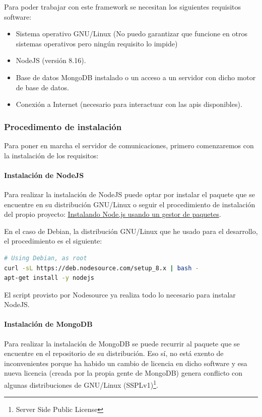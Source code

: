 \documentclass[spanish,12pt, a4paper, twoside]{paper}
\begin{document}
Para poder trabajar con este framework se necesitan los siguientes requisitos software:

\begin{itemize}
\item Sistema operativo GNU/Linux (No puedo garantizar que funcione en otros sistemas operativos pero ningún requisito lo impide)
\item NodeJS (versión 8.16).
\item Base de datos MongoDB instalado o un acceso a un servidor con dicho motor de base de datos.
\item Conexión a Internet (necesario para interactuar con las apis disponibles).
\end{itemize}

\subsubsection{Procedimento de instalación}

Para poner en marcha el servidor de comunicaciones, primero comenzaremos con la instalación de los requisitos:

\paragraph{Instalación de NodeJS}

Para realizar la instalación de NodeJS puede optar por instalar el paquete que se encuentre en su distribución GNU/Linux o seguir el procedimiento de instalación del propio proyecto: \href{https://nodejs.org/es/download/package-manager/}{Instalando Node.js usando un gestor de paquetes}.
\newline

En el caso de Debian, la distribución GNU/Linux que he usado para el desarrollo, el procedimiento es el siguiente:

\begin{lstlisting}[language=sh]
# Using Debian, as root
curl -sL https://deb.nodesource.com/setup_8.x | bash -
apt-get install -y nodejs
\end{lstlisting}

El script provisto por Nodesource ya realiza todo lo necesario para instalar NodeJS.

\paragraph{Instalación de MongoDB} Para realizar la instalación de MongoDB se puede recurrir al paquete que se encuentre en el repositorio de su distribución. Eso sí, no está exento de inconvenientes porque ha habido un cambio de licencia en dicho software y esa nueva licencia (creada por la propia gente de MongoDB) genera conflicto con algunas distribuciones de GNU/Linux (SSPLv1)\footnote{Server Side Public License}.
\end{document}
